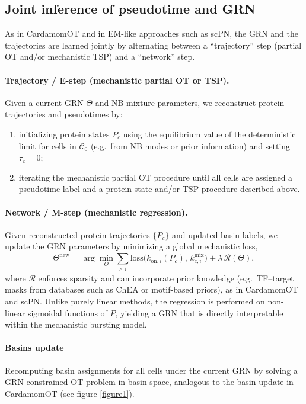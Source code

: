 \documentclass[10pt]{article}
\begin{document}
\subsection{Joint inference of pseudotime and GRN}

As in CardamomOT and in EM-like approaches such as scPN, the GRN and the trajectories are learned jointly by alternating between a ``trajectory'' step (partial OT and/or mechanistic TSP) and a ``network'' step. 

\paragraph{Trajectory / E-step (mechanistic partial OT or TSP).}  
Given a current GRN $\Theta$ and NB mixture parameters, we reconstruct protein trajectories and pseudotimes by:
\begin{enumerate}
    \item initializing protein states $P_c$ using the equilibrium value of the deterministic limit for cells in $\mathcal{C}_0$ (e.g.\ from NB modes or prior information) and setting $\tau_c=0$;
    \item iterating the mechanistic partial OT procedure until all cells are assigned a pseudotime label and a protein state and/or TSP procedure described above.
\end{enumerate}

\paragraph{Network / M-step (mechanistic regression).}  
Given reconstructed protein trajectories $\{P_c\}$ and updated basin labels, we update the GRN parameters by minimizing a global mechanistic loss,
\[
\Theta^{\mathrm{new}} = \arg\min_{\Theta}
\sum_{c,i} \mathrm{loss}\bigl(k_{\mathrm{on},i}(P_c),\,k^{\mathrm{mix}}_{c,i}\bigr)
+ \lambda \,\mathcal{R}(\Theta),
\]
where $\mathcal{R}$ enforces sparsity and can incorporate prior knowledge (e.g.\ TF–target masks from databases such as ChEA or motif-based priors), as in CardamomOT and scPN.  Unlike purely linear methods, the regression is performed on non-linear sigmoidal functions of $P$, yielding a GRN that is directly interpretable within the mechanistic bursting model.


\paragraph{Basins update}  
Recomputing basin assignments for all cells under the current GRN by solving a GRN-constrained OT problem in basin space, analogous to the basin update in CardamomOT (see figure \ref{figure1}). 
\end{document}
